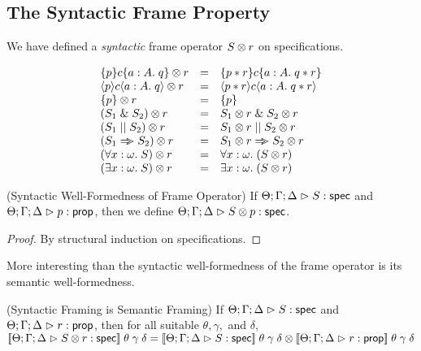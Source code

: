 \subsection{The Syntactic Frame Property}

We have defined a \emph{syntactic} frame operator ${S} \otimes {r}$ on
specifications.

\begin{displaymath}
  \begin{array}{lcl}
    {\{{p}\}{c}\{{a:A}.\;{q}\}} \otimes {r}    & = & \{{p * r}\}{c}\{{a:A}.\;{q * r}\} \\
    {\langle{p}\rangle{c}\langle{a:A}.\;{q}\rangle} \otimes {r}   & = & \langle{p * r}\rangle{c}\langle{a:A}.\;{q * r}\rangle \\
    {\{{p}\}} \otimes {r}              & = & \{{p}\} \\
    {(S_1 \;\&\; S_2)} \otimes {r}      & = & {S_1} \otimes {r} \;\&\; {S_2} \otimes {r} \\
    {(S_1 \;||\; S_2)} \otimes {r}       & = & {S_1} \otimes {r} \;||\; {S_2} \otimes {r} \\
    {(S_1 \Rightarrow\!\!\!> S_2)} \otimes {r}      & = & {S_1} \otimes {r} \Rightarrow\!\!\!> {S_2} \otimes {r} \\
    {(\forall x:\omega.\; S)} \otimes {r} & = & \forall x:\omega.\; ({S} \otimes {r}) \\
    {(\exists x:\omega.\; S)} \otimes {r} & = & \exists x:\omega.\; ({S} \otimes {r}) \\
  \end{array}
\end{displaymath}

\begin{prop*}{(Syntactic Well-Formedness of Frame Operator)}
If ${\Theta; \Gamma; \Delta} \vartriangleright {S} : \mathsf{spec}$ and ${\Theta; \Gamma; \Delta} \vartriangleright {p} : {\mathsf{prop}}$, then
we define ${\Theta; \Gamma; \Delta} \vartriangleright {{S} \otimes {p}} : \mathsf{spec}$.  
\end{prop*}
\begin{proof}
  By structural induction on specifications.
\end{proof}

More interesting than the syntactic well-formedness of the frame
operator is its semantic well-formedness. 

\begin{lemma*}{(Syntactic Framing is Semantic Framing)}
If ${\Theta; \Gamma; \Delta} \vartriangleright {S} : \mathsf{spec}$ and ${\Theta; \Gamma; \Delta} \vartriangleright {r} : {\mathsf{prop}}$, then for all suitable $\theta, \gamma,$ and $\delta$, 
$[\![{{\Theta; \Gamma; \Delta} \vartriangleright {{S} \otimes {r}} : \mathsf{spec}}]\!]\;\theta\;\gamma\;\delta = 
{[\![{{\Theta; \Gamma; \Delta} \vartriangleright {S} : \mathsf{spec}}]\!]\;\theta\;\gamma\;\delta} \otimes {[\![{{\Theta; \Gamma; \Delta} \vartriangleright {r} : {\mathsf{prop}}}]\!]\;\theta\;\gamma\;\delta}$ \\
\end{lemma*}

